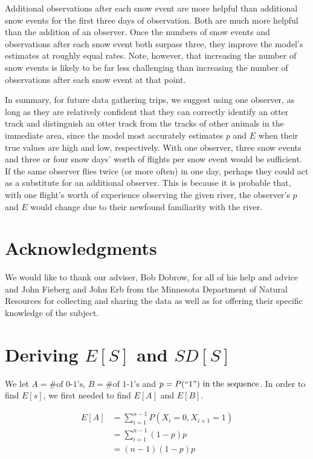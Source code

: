 \documentclass[12pt]{article}
\begin{document}
    Additional observations after each snow event are more helpful than
    additional snow events for the first three days of observation.
    Both are much more helpful than the addition of an observer.
    Once the numbers of snow events and observations after each snow event both
    surpass three, they improve the model's estimates at roughly equal rates.
    Note, however, that increasing the number of snow events is likely to be far
    less challenging than increasing the number of observations after each snow
    event at that point.

    In summary, for future data gathering trips, we suggest using one
    observer, as long as they are relatively confident that they can correctly
    identify an otter track and distinguish an otter track from the tracks of
    other animals in the immediate area, since the model most accurately
    estimates \(p\) and \(E\) when their true values are high and low,
    respectively. With one observer, three snow events and three or four snow
    days' worth of flights per snow event would be sufficient. If the same
    observer flies twice (or more often) in one day, perhaps they could act as a
    substitute for an additional observer. This is because it is probable that,
    with one flight's worth of experience observing the given river, the
    observer's \(p\) and \(E\) would change due to their newfound familiarity
    with the river.

\section{Acknowledgments}
We would like to thank our adviser, Bob Dobrow, for all of his help and advice 
and John Fieberg and John Erb from the Minnesota Department of Natural Resources
for collecting and sharing the data as well as for offering their specific
knowledge of the subject.




\appendix
\section{Deriving \(E[S]\) and \(SD[S]\)}
\label{math}
    We let \(A = \text{\# of
    0-1's}\), \(B=\text{\# of 1-1's}\) and \(p=P(``1")\text{ in the sequence}\).
    In order to find \(E[s]\), we first needed to find \(E[A]\) and
    \(E[B]\).

    \begin{equation*}
        \begin{split}
        E[A]& =\sum_{i=1}^{n-1}P(X_i=0,X_{i+1}=1) \\
            & =\sum_{i=1}^{n-1}(1-p)p \\
            & =(n-1)(1-p)p \\
        \end{split}
    \end{equation*}
\end{document}
